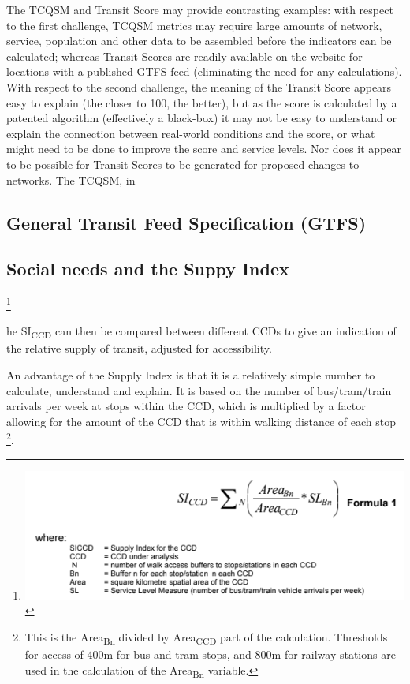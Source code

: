 \documentclass[numbered]{trbunofficial}
\begin{document}
The TCQSM and Transit Score may provide contrasting examples: with
respect to the first challenge, TCQSM metrics may require large amounts
of network, service, population and other data to be assembled before
the indicators can be calculated; whereas Transit Scores are readily
available on the \citet{WalkScore:2023tg} website for locations with a
published GTFS feed (eliminating the need for any calculations). With
respect to the second challenge, the meaning of the Transit Score
appears easy to explain (the closer to 100, the better), but as the
score is calculated by a patented algorithm (effectively a black-box) it
may not be easy to understand or explain the connection between
real-world conditions and the score, or what might need to be done to
improve the score and service levels. Nor does it appear to be possible
for Transit Scores to be generated for proposed changes to networks. The
TCQSM, in

\hypertarget{general-transit-feed-specification-gtfs}{%
\subsection{General Transit Feed Specification
(GTFS)}\label{general-transit-feed-specification-gtfs}}

\hypertarget{social-needs-and-the-suppy-index}{%
\subsection{Social needs and the Suppy
Index}\label{social-needs-and-the-suppy-index}}

\footnote{\includegraphics{Supply_index.png}}

he SI\textsubscript{CCD} can then be compared between different CCDs to
give an indication of the relative supply of transit, adjusted for
accessibility.

An advantage of the Supply Index is that it is a relatively simple
number to calculate, understand and explain. It is based on the number
of bus/tram/train arrivals per week at stops within the CCD, which is
multiplied by a factor allowing for the amount of the CCD that is within
walking distance of each stop \footnote{This is the
  Area\textsubscript{Bn} divided by Area\textsubscript{CCD} part of the
  calculation. Thresholds for access of 400m for bus and tram stops, and
  800m for railway stations are used in the calculation of the
  Area\textsubscript{Bn} variable.}.
\end{document}
